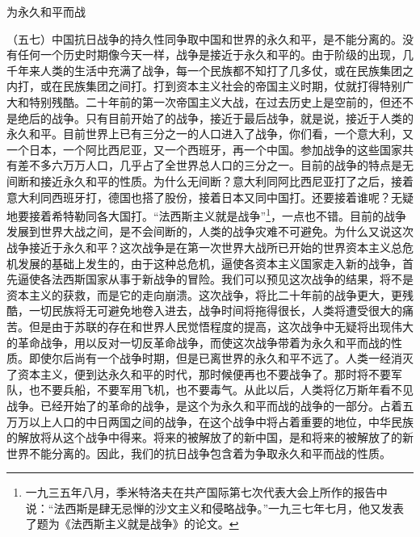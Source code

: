 \documentclass[UTF8, 12pt, a4paper]{ctexrep}
\begin{document}
为永久和平而战

（五七）中国抗日战争的持久性同争取中国和世界的永久和平，是不能分离的。没有任何一个历史时期像今天一样，战争是接近于永久和平的。由于阶级的出现，几千年来人类的生活中充满了战争，每一个民族都不知打了几多仗，或在民族集团之内打，或在民族集团之间打。打到资本主义社会的帝国主义时期，仗就打得特别广大和特别残酷。二十年前的第一次帝国主义大战，在过去历史上是空前的，但还不是绝后的战争。只有目前开始了的战争，接近于最后战争，就是说，接近于人类的永久和平。目前世界上已有三分之一的人口进入了战争，你们看，一个意大利，又一个日本，一个阿比西尼亚，又一个西班牙，再一个中国。参加战争的这些国家共有差不多六万万人口，几乎占了全世界总人口的三分之一。目前的战争的特点是无间断和接近永久和平的性质。为什么无间断？意大利同阿比西尼亚打了之后，接着意大利同西班牙打，德国也搭了股份，接着日本又同中国打。还要接着谁呢？无疑地要接着希特勒同各大国打。“法西斯主义就是战争”\footnote{一九三五年八月，季米特洛夫在共产国际第七次代表大会上所作的报告中说：“法西斯是肆无忌惮的沙文主义和侵略战争。”一九三七年七月，他又发表了题为《法西斯主义就是战争》的论文。}，一点也不错。目前的战争发展到世界大战之间，是不会间断的，人类的战争灾难不可避免。为什么又说这次战争接近于永久和平？这次战争是在第一次世界大战所已开始的世界资本主义总危机发展的基础上发生的，由于这种总危机，逼使各资本主义国家走入新的战争，首先逼使各法西斯国家从事于新战争的冒险。我们可以预见这次战争的结果，将不是资本主义的获救，而是它的走向崩溃。这次战争，将比二十年前的战争更大，更残酷，一切民族将无可避免地卷入进去，战争时间将拖得很长，人类将遭受很大的痛苦。但是由于苏联的存在和世界人民觉悟程度的提高，这次战争中无疑将出现伟大的革命战争，用以反对一切反革命战争，而使这次战争带着为永久和平而战的性质。即使尔后尚有一个战争时期，但是已离世界的永久和平不远了。人类一经消灭了资本主义，便到达永久和平的时代，那时候便再也不要战争了。那时将不要军队，也不要兵船，不要军用飞机，也不要毒气。从此以后，人类将亿万斯年看不见战争。已经开始了的革命的战争，是这个为永久和平而战的战争的一部分。占着五万万以上人口的中日两国之间的战争，在这个战争中将占着重要的地位，中华民族的解放将从这个战争中得来。将来的被解放了的新中国，是和将来的被解放了的新世界不能分离的。因此，我们的抗日战争包含着为争取永久和平而战的性质。
\end{document}
